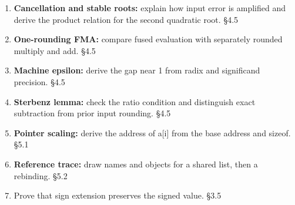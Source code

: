 \documentclass[11pt]{article}
\begin{document}
\begin{keepsection}
\begin{enumerate}
\item \textbf{Cancellation and stable roots:} explain how input error is amplified and derive the product relation for the second quadratic root. \hfill{\small\color{FAUblue}§4.5}
\item \textbf{One-rounding FMA:} compare fused evaluation with separately rounded multiply and add. \hfill{\small\color{FAUblue}§4.5}
\item \textbf{Machine epsilon:} derive the gap near 1 from radix and significand precision. \hfill{\small\color{FAUblue}§4.5}
\item \textbf{Sterbenz lemma:} check the ratio condition and distinguish exact subtraction from prior input rounding. \hfill{\small\color{FAUblue}§4.5}
\item \textbf{Pointer scaling:} derive the address of a[i] from the base address and sizeof. \hfill{\small\color{FAUblue}§5.1}
\item \textbf{Reference trace:} draw names and objects for a shared list, then a rebinding. \hfill{\small\color{FAUblue}§5.2}
\item Prove that sign extension preserves the signed value. \hfill{\small\color{FAUblue}§3.5}
\end{enumerate}
\end{keepsection}
\end{document}
